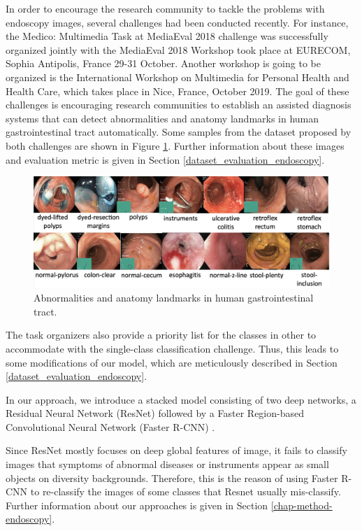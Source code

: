 In order to encourage the research community to tackle the problems with endoscopy images, several challenges had been conducted recently. For instance, the Medico: Multimedia Task at MediaEval 2018 challenge \cite{taskoverview} was successfully organized jointly with the MediaEval 2018 Workshop took place at EURECOM, Sophia Antipolis, France 29-31 October. Another workshop is going to be organized is the International Workshop on Multimedia for Personal Health and Health Care, which takes place in Nice, France, October 2019. The goal of these challenges is encouraging research communities to establish an assisted diagnosis systems that can detect abnormalities and anatomy landmarks in human gastrointestinal tract automatically. Some samples from the dataset proposed by both challenges are shown in Figure \ref{fig:gi_track_imgs}. Further information about these images and evaluation metric is given in Section \ref{dataset_evaluation_endoscopy}.

\begin{figure}[thb]
\begin{center}
\includegraphics[width=\textwidth]{endoscopy_resources/gi_track_imgs.png}
\end{center}
  \caption {Abnormalities and anatomy landmarks in human gastrointestinal tract.}
\label{fig:gi_track_imgs}
\end{figure}


The task organizers also provide a priority list for the classes in other to accommodate with the single-class classification challenge. Thus, this leads to some modifications of our model, which are meticulously described in Section \ref{dataset_evaluation_endoscopy}.

In our approach, we introduce a stacked model consisting of two deep networks, a Residual Neural Network (ResNet) \cite{He_2016} followed by a Faster Region-based Convolutional Neural Network (Faster R-CNN) \cite{NIPS2015_5638}. 

Since ResNet mostly focuses on deep global features of image, it fails to classify images that symptoms of abnormal diseases or instruments appear as small objects on diversity backgrounds. Therefore, this is the reason of using Faster R-CNN to re-classify the images of some classes that Resnet usually mis-classify. Further information about our approaches is given in Section \ref{chap-method-endoscopy}.


